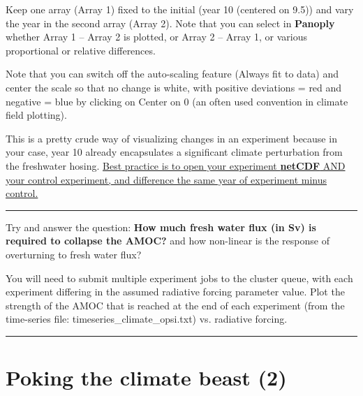 Keep one array (Array 1) fixed to the initial (year 10 (centered on 9.5)) and vary the year in the second array (Array 2). Note that you can select in \textbf{Panoply} whether \textsf{\footnotesize Array 1 – Array 2} is plotted, or \textsf{\footnotesize Array 2 – Array 1}, or various proportional or relative differences.

Note that you can switch off the auto-scaling feature (Always fit to data) and center the scale so that no change is white, with positive deviations = red and negative = blue by clicking on Center on 0 (an often used convention in climate field plotting).

\vspace{1mm}
This is a pretty crude way of visualizing changes in an experiment because in your case, year 10 already encapsulates a significant climate perturbation from the freshwater hosing. \uline{Best practice is to open your experiment \textbf{netCDF} AND your control experiment, and difference the same year of experiment minus control.}

\vspace{1mm}\noindent\rule{4cm}{0.5pt}\vspace{2mm}

\noindent Try and answer the question: \textbf{How much fresh water flux (in Sv) is required to collapse the AMOC?} and how non-linear is the response of overturning to fresh water flux?

You will need to submit multiple experiment jobs to the cluster queue, with each experiment differing in the assumed radiative forcing parameter value. Plot the strength of the AMOC that is reached at the end of each experiment (from the time-series file: \textsf{\footnotesize timeseries\_climate\_opsi.txt}) vs. radiative forcing.

\vspace{1mm}\noindent\rule{4cm}{0.5pt}\vspace{2mm}

\newpage

\section{Poking the climate beast (2)}

